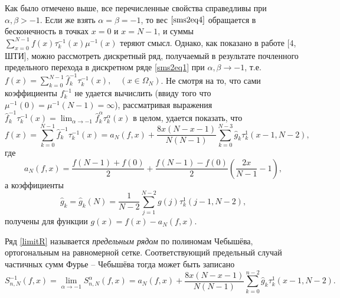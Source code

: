 \documentclass[12pt]{book}
\begin{document}
Как было отмечено выше, все перечисленные свойства справедливы при $\alpha, \beta > -1$. Если же взять $\alpha = \beta = -1$, то вес $\eqref{sms2eq4}$ обращается в бесконечность в точках $x=0$ и $x=N-1$, и суммы $\sum\limits_{x=0}^{N-1} f(x)\tau_{k}^{-1}(x)\mu^{-1}(x)$ теряют смысл.
Однако, как показано в работе [4, ШТИ], можно рассмотреть дискретный ряд, получаемый в результате почленного предельного перехода в дискретном ряде \eqref{sms2eq1} при $\alpha,\beta \rightarrow -1$, т.е. $f(x) = \sum\limits_{k=0}^{N-1}\hat{f}^{-1}_k\tau_{k}^{-1}(x),\quad (x \in \Omega_N)$. %
Не смотря на то, что сами коэффициенты $f_k^{-1}$ не удается вычислить (ввиду того что $\mu^{-1}(0)=\mu^{-1}(N-1)=\infty$), рассматривая выражения $\hat{f}^{-1}_k\tau_{k}^{-1}(x) = \lim_{\alpha \rightarrow -1} \hat{f}^{\alpha}_k\tau_k^{\alpha}(x)$ в целом, удается показать, что
\begin{equation}
\label{limitR}
 f(x) = \sum\limits_{k=0}^{N-1}\hat{f}^{-1}_k  \tau_{k}^{-1}(x) =
a_N(f,x) + \frac{8x(N-x-1)}{N(N-1)} \sum\limits_{k=0}^{N-3} \hat{g}_k \tau_{k}^{1}(x-1,N-2),
\end{equation}
где
\begin{equation}
\label{af}
a_N(f,x) = \frac{f(N-1)+f(0)}{2} + \frac{f(N-1)-f(0)}{2}\left( \frac{2x}{N-1}-1\right),
\end{equation}
а коэффициенты
\begin{equation}
\label{gk}
\hat{g}_k = \hat{g}_k(N) = \frac{1}{N-2} \sum\limits_{j=1}^{N-2} g(j) \tau_{k}^{1}(j-1,N-2) ,
\end{equation}
получены для функции $g(x) = f(x) - a_N(f,x)$.

Ряд \eqref{limitR} называется \textit{предельным рядом } по полиномам Чебыш\"ева, ортогональным на равномерной сетке. Соответствующий предельный случай частичных сумм Фурье -- Чебыш\"ева тогда может быть записано
\begin{equation}
\label{limitS}
 S_{n,N}^{-1}(f,x) = \lim_{\alpha \rightarrow -1} S_{n,N}^{\alpha}(f,x) =
 a_N(f,x) + \frac{8x(N-x-1)}{N(N-1)} \sum\limits_{k=0}^{n-2} \hat{g}_k \tau_{k}^{1}(x-1,N-2).
\end{equation}
\end{document}
